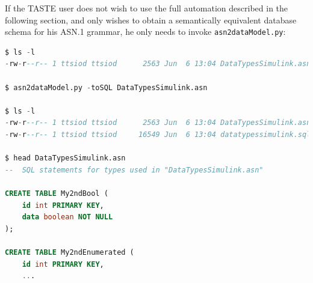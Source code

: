 \documentclass[11pt]{book}
\begin{document}
If the TASTE user does not wish to use the full automation described in the following section, and only wishes to obtain a semantically equivalent database schema for his ASN.1 grammar, he only needs to invoke {\tt asn2dataModel.py}:

\begin{lstlisting}[language=SQL]
$ ls -l
-rw-r--r-- 1 ttsiod ttsiod      2563 Jun  6 13:04 DataTypesSimulink.asn

$ asn2dataModel.py -toSQL DataTypesSimulink.asn

$ ls -l
-rw-r--r-- 1 ttsiod ttsiod      2563 Jun  6 13:04 DataTypesSimulink.asn
-rw-r--r-- 1 ttsiod ttsiod     16549 Jun  6 13:04 datatypessimulink.sql

$ head DataTypesSimulink.asn
--  SQL statements for types used in "DataTypesSimulink.asn"

CREATE TABLE My2ndBool (
    id int PRIMARY KEY,
    data boolean NOT NULL
);

CREATE TABLE My2ndEnumerated (
    id int PRIMARY KEY,
    ...
\end{lstlisting}
\end{document}
